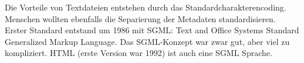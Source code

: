 Die Vorteile von Textdateien entstehen durch das Standardcharakterencoding. Menschen wollten ebenfalls die Separierung der Metadaten standardisieren. Erster Standard entstand um 1986 mit SGML: Text and Office Systems Standard Generalized Markup Language. Das SGML-Konzept war zwar gut, aber viel zu kompliziert. HTML (erste Version war 1992) ist auch eine SGML Sprache.